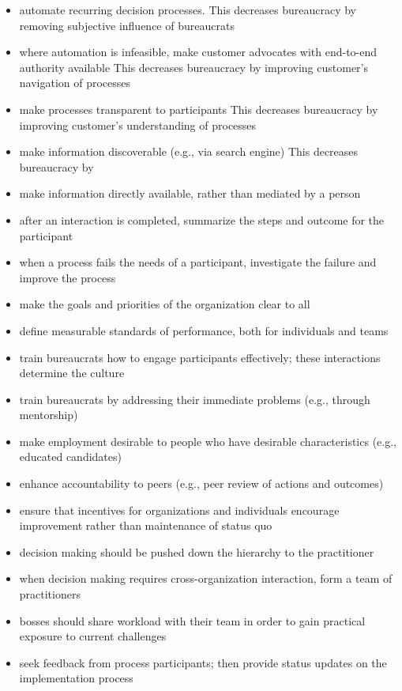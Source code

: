\begin{itemize}
    \item automate recurring decision processes. This decreases bureaucracy by removing subjective influence of bureaucrats
\item where automation is infeasible, make customer advocates with end-to-end authority available
This decreases bureaucracy by improving customer's navigation of processes
\item make processes transparent to participants
This decreases bureaucracy by improving customer's understanding of processes
\item make information discoverable (e.g., via search engine) 
This decreases bureaucracy by 
\item make information directly available, rather than mediated by a person
\item after an interaction is completed, summarize the steps and outcome for the participant
\item when a process fails the needs of a participant, investigate the failure and improve the process
\item make the goals and priorities of the organization clear to all
\item define measurable standards of performance, both for individuals and teams
\item train bureaucrats how to engage participants effectively; these interactions determine the culture
\item train bureaucrats by addressing their immediate problems (e.g., through mentorship)
\item make employment desirable to people who have desirable characteristics (e.g., educated candidates)
\item enhance accountability to peers (e.g., peer review of actions and outcomes)
\item ensure that incentives for organizations and individuals encourage improvement rather than maintenance of status quo
\item decision making should be pushed down the hierarchy to the practitioner
\item when decision making requires cross-organization interaction, form a team of practitioners
\item bosses should share workload with their team in order to gain practical exposure to current challenges
\item seek feedback from process participants; then provide status updates on the implementation process
\end{itemize}

